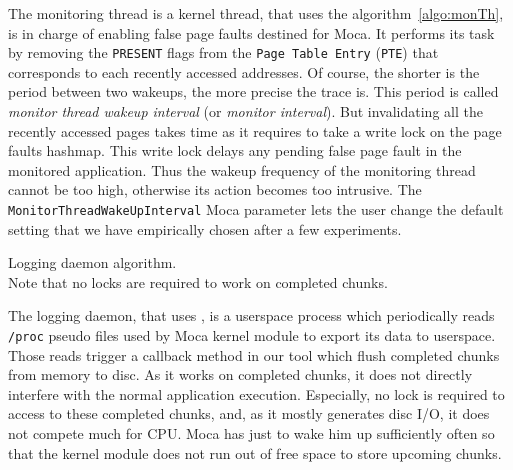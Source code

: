 The monitoring thread is a kernel thread, that uses the algorithm~\ref{algo:monTh}, is in charge of enabling false page faults destined for \gls{Moca}.
It performs its task by removing the \texttt{PRESENT} flags from the \texttt{Page Table Entry} (\texttt{PTE}) that corresponds to each recently accessed addresses.
Of course, the shorter is the period between two wakeups, the more precise the trace is.
This period is called \emph{monitor thread wakeup interval} (or \emph{monitor interval}).
But invalidating all the recently accessed pages takes time as it requires to take a write lock on the page faults hashmap.
This write lock delays any pending false page fault in the monitored application.
Thus the wakeup frequency of the monitoring thread cannot be too high, otherwise its action becomes too intrusive.
The \texttt{MonitorThreadWakeUpInterval} \gls{Moca} parameter lets the user change the default setting that we have empirically chosen after a few experiments.

\begin{algorithm}[htb]
    \caption[Moca Logging daemon algorithm.]{Logging daemon algorithm.\\
        \footnotesize{Note that no locks are required to work on completed chunks.}}
    \label{alg:moca-log}
    \begin{algorithmic}[1]
                \State {}
                \State {}
                \EndFor
            \EndFor
            \State {}
        \EndWhile
    \end{algorithmic}
\end{algorithm}

The logging daemon, that uses , is a userspace process which periodically reads \texttt{/proc} pseudo files used by \gls{Moca} kernel module to export its data to userspace.
Those reads trigger a callback method in our tool which flush completed chunks from memory to disc.
As it works on completed chunks, it does not directly interfere with the normal application execution.
Especially, no lock is required to access to these completed chunks, and, as it mostly generates disc I/O, it does not compete much for CPU.
\gls{Moca} has just to wake him up sufficiently often so that the kernel module does not run out of free space to store upcoming chunks.

